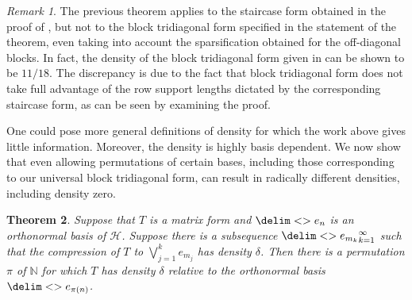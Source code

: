 \documentclass[10pt,reqno]{amsart}
\newtheorem{theorem}{Theorem}[section]
\theoremstyle{remark}
\newtheorem{remark}[theorem]{Remark}
\newcommand{\Hil}{\mathcal{H}}
\newcommand{\seq}{\delim<>}
\numberwithin{equation}{section}
\begin{document}
\begin{remark}
  The previous theorem applies to the staircase form obtained in the proof of , but not to the block tridiagonal form specified in the statement of the theorem, even taking into account the sparsification obtained for the off-diagonal blocks.
  In fact, the density of the block tridiagonal form given in  can be shown to be $11/18$.
  The discrepancy is due to the fact that block tridiagonal form does not take full advantage of the row support lengths dictated by the corresponding staircase form, as can be seen by examining the proof.
\end{remark}

One could pose more general definitions of density for which the work above gives little information.
Moreover, the density is highly basis dependent.
We now show that even allowing permutations of certain bases, including those corresponding to our universal block tridiagonal form, can result in radically different densities, including density zero.

\begin{theorem}
  \label{thm:subsequence-density-permutation}
  Suppose that $T$ is a matrix form and $\seq{e_n}$ is an orthonormal basis of $\Hil$.
  Suppose there is a subsequence $\seq{e_{m_k}}_{k=1}^{\infty}$ such that the compression of $T$ to $\bigvee_{j=1}^k e_{m_j}$ has density $\delta$.
  Then there is a permutation $\pi$ of $\mathbb{N}$ for which $T$ has density $\delta$ relative to the orthonormal basis $\seq{e_{\pi(n)}}$.
\end{theorem}
\end{document}
